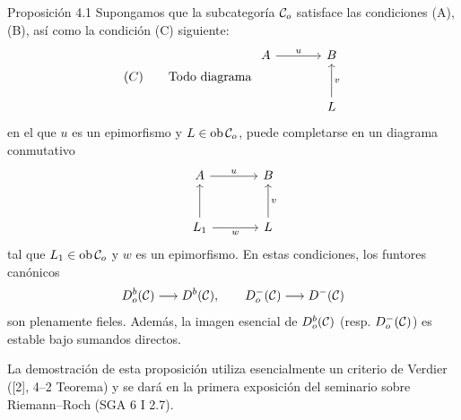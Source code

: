 \begin{statement}{Proposición 4.1}
Supongamos que la subcategoría $\mathcal C_o$ satisface las condiciones (A), (B), así como la condición (C) siguiente:
\[
(C)\qquad
\text{Todo diagrama }
\begin{tikzcd}[column sep=large,row sep=large]
A \arrow[r,"u"]&B\\
&L \arrow[u,"v"']
\end{tikzcd}
\]
en el que $u$ es un epimorfismo y $L\in\operatorname{ob}\mathcal C_o$, puede completarse en un diagrama conmutativo
\[
\begin{tikzcd}[column sep=large,row sep=large]
A \arrow[r,"u"]&B\\
L_1 \arrow[u] \arrow[r,"w"']&L \arrow[u,"v"']
\end{tikzcd}
\]
tal que $L_1\in\operatorname{ob}\mathcal C_o$ y $w$ es un epimorfismo. En estas condiciones, los funtores canónicos
\[
D_o^b(\mathcal C)\longrightarrow D^b(\mathcal C),\qquad
D_o^-(\mathcal C)\longrightarrow D^-(\mathcal C)
\]
son plenamente fieles. Además, la imagen esencial de $D_o^b(\mathcal C)$ (resp. $D_o^-(\mathcal C)$) es estable bajo sumandos directos.
\end{statement}

La demostración de esta proposición utiliza esencialmente un criterio de Verdier ([2], 4--2 Teorema) y se dará en la primera exposición del seminario sobre Riemann--Roch (SGA 6 I 2.7).
